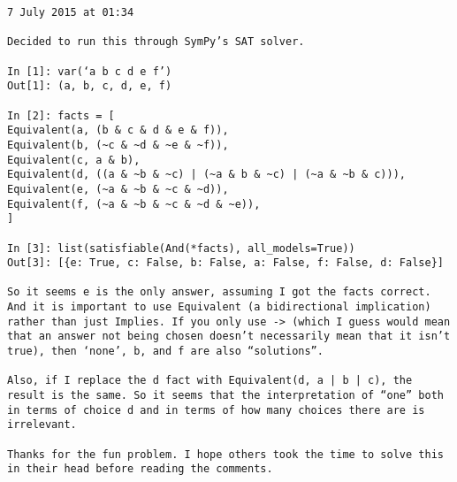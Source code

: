 \begin{lstlisting}
7 July 2015 at 01:34

Decided to run this through SymPy’s SAT solver.

In [1]: var(‘a b c d e f’)
Out[1]: (a, b, c, d, e, f)

In [2]: facts = [
Equivalent(a, (b & c & d & e & f)),
Equivalent(b, (~c & ~d & ~e & ~f)),
Equivalent(c, a & b),
Equivalent(d, ((a & ~b & ~c) | (~a & b & ~c) | (~a & ~b & c))),
Equivalent(e, (~a & ~b & ~c & ~d)),
Equivalent(f, (~a & ~b & ~c & ~d & ~e)),
]

In [3]: list(satisfiable(And(*facts), all_models=True))
Out[3]: [{e: True, c: False, b: False, a: False, f: False, d: False}]

So it seems e is the only answer, assuming I got the facts correct. And it is important to use Equivalent (a bidirectional implication) rather than just Implies. If you only use -> (which I guess would mean that an answer not being chosen doesn’t necessarily mean that it isn’t true), then ‘none’, b, and f are also “solutions”.

Also, if I replace the d fact with Equivalent(d, a | b | c), the result is the same. So it seems that the interpretation of “one” both in terms of choice d and in terms of how many choices there are is irrelevant.

Thanks for the fun problem. I hope others took the time to solve this in their head before reading the comments.
\end{lstlisting}

